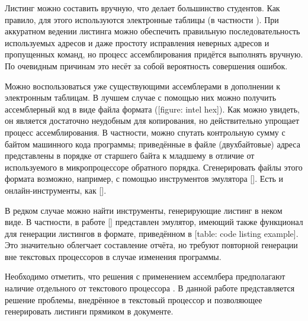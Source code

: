 \startitemize

\startitem
Листинг можно составить вручную, что делает большинство студентов. Как правило,
для этого используются электронные таблицы (в частности ). При аккуратном ведении листинга можно обеспечить правильную
последовательность используемых адресов и даже простоту исправления неверных
адресов и пропущенных команд, но процесс ассемблирования придётся
выполнять вручную. По очевидным причинам это несёт за собой вероятность
совершения ошибок.
\stopitem

\startitem
Можно воспользоваться уже существующими ассемблерами в дополнении к электронным
таблицам. В лучшем случае с помощью них можно получить ассемблерный код в виде
файла формата  ([figure: intel hex]). Как
можно увидеть, он является достаточно неудобным для копирования, но
действительно упрощает процесс ассемблирования. В частности, можно спутать
контрольную сумму с байтом машинного кода программы; приведённые в файле
(двухбайтовые) адреса представлены в порядке от старшего байта к младшему в
отличие от используемого в микропроцессоре обратного порядка. Сгенерировать
файлы этого формата возможно, например, с помощью инструментов эмулятора
 []. Есть и онлайн-инструменты, как
 [].

\startplacefigure[
    title={Формат \corp{Intel \abbr{HEX}}. Выделены по порядку: количество байт, адрес, тип записи, данные, контрольная сумма},
    reference={figure: intel hex},
    minwidth=\textwidth,
]


\stopplacefigure
\stopitem

\startitem
В редком случае можно найти инструменты, генерирующие листинг в неком виде. В
частности, в работе  [] представлен эмулятор,
имеющий также функционал для генерации листингов в формате, приведённом в
[table: code listing example]. Это значительно облегчает
составление отчёта, но требуют повторной генерации вне текстовых процессоров в
случае изменения программы.
\stopitem

\stopitemize

Необходимо отметить, что решения с применением ассемлбера предполагают наличие
отдельного от текстового процессора . В данной работе представляется
решение проблемы, внедрённое в текстовый процессор и позволяющее генерировать
листинги прямиком в документе.

